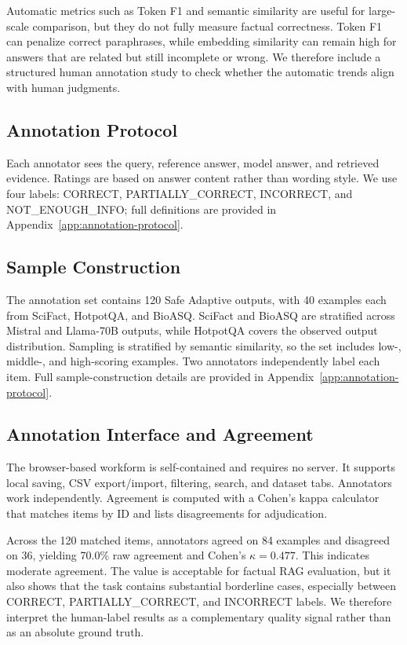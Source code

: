 \documentclass[11pt]{article}
\begin{document}
Automatic metrics such as Token F1 and semantic similarity are useful for large-scale comparison, but they do not fully measure factual correctness. Token F1 can penalize correct paraphrases, while embedding similarity can remain high for answers that are related but still incomplete or wrong. We therefore include a structured human annotation study to check whether the automatic trends align with human judgments.

\subsection{Annotation Protocol}

Each annotator sees the query, reference answer, model answer, and retrieved evidence. Ratings are based on answer content rather than wording style. We use four labels: CORRECT, PARTIALLY\_CORRECT, INCORRECT, and NOT\_ENOUGH\_INFO; full definitions are provided in Appendix~\ref{app:annotation-protocol}.

\subsection{Sample Construction}

The annotation set contains 120 Safe Adaptive outputs, with 40 examples each from SciFact, HotpotQA, and BioASQ. SciFact and BioASQ are stratified across Mistral and Llama-70B outputs, while HotpotQA covers the observed output distribution. Sampling is stratified by semantic similarity, so the set includes low-, middle-, and high-scoring examples. Two annotators independently label each item. Full sample-construction details are provided in Appendix~\ref{app:annotation-protocol}.


\subsection{Annotation Interface and Agreement}

The browser-based workform is self-contained and requires no server. It supports local saving, CSV export/import, filtering, search, and dataset tabs. Annotators work independently. Agreement is computed with a Cohen's kappa calculator that matches items by ID and lists disagreements for adjudication.

Across the 120 matched items, annotators agreed on 84 examples and disagreed on 36, yielding 70.0\% raw agreement and Cohen's $\kappa = 0.477$. This indicates moderate agreement. The value is acceptable for factual RAG evaluation, but it also shows that the task contains substantial borderline cases, especially between CORRECT, PARTIALLY\_CORRECT, and INCORRECT labels. We therefore interpret the human-label results as a complementary quality signal rather than as an absolute ground truth.
\end{document}
